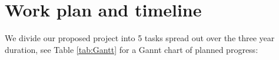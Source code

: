 \documentclass[a4paper,11pt]{scrartcl}
\begin{document}
\section{Work plan and timeline}\label{sec:workplan}



We divide our proposed project into 5 tasks spread out over the three year duration, see Table \ref{tab:Gantt} for a Gannt chart of planned progress:

\end{document}
